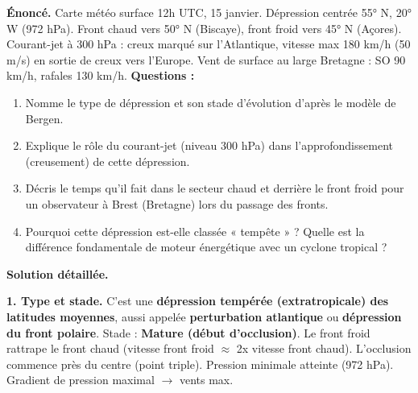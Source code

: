 \documentclass[11pt]{article}
\begin{document}
\begin{exoresolu}
\textbf{Énoncé.} Carte météo surface 12h UTC, 15 janvier. Dépression centrée 55° N, 20° W (972 hPa). Front chaud vers 50° N (Biscaye), front froid vers 45° N (Açores). Courant-jet à 300 hPa : creux marqué sur l'Atlantique, vitesse max 180 km/h (50 m/s) en sortie de creux vers l'Europe. Vent de surface au large Bretagne : SO 90 km/h, rafales 130 km/h.
\textbf{Questions :}
\begin{enumerate}
    \item Nomme le type de dépression et son stade d'évolution d'après le modèle de Bergen.
    \item Explique le rôle du courant-jet (niveau 300 hPa) dans l'approfondissement (creusement) de cette dépression.
    \item Décris le temps qu'il fait dans le secteur chaud et derrière le front froid pour un observateur à Brest (Bretagne) lors du passage des fronts.
    \item Pourquoi cette dépression est-elle classée « tempête » ? Quelle est la différence fondamentale de moteur énergétique avec un cyclone tropical ?
\end{enumerate}

\tcblower
\textbf{Solution détaillée.}

\textbf{1. Type et stade.}
C'est une \textbf{dépression tempérée (extratropicale) des latitudes moyennes}, aussi appelée \textbf{perturbation atlantique} ou \textbf{dépression du front polaire}.
Stade : \textbf{Mature (début d'occlusion)}. Le front froid rattrape le front chaud (vitesse front froid $\approx$ 2x vitesse front chaud). L'occlusion commence près du centre (point triple). Pression minimale atteinte (972 hPa). Gradient de pression maximal $\to$ vents max.


\end{exoresolu}
\end{document}
